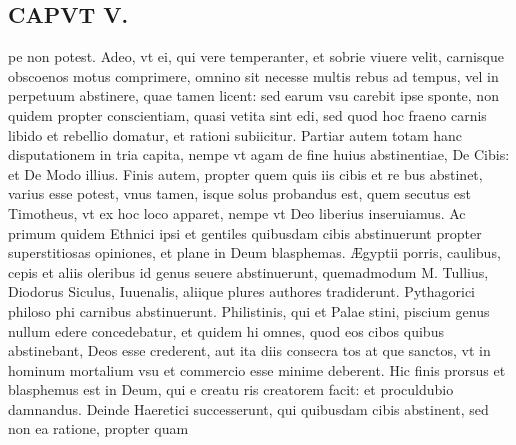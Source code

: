 \documentclass{article}
\begin{document}
\begin{pages}
\section*{CAPVT  V. }
\marginpar{[ p.373 ]}\pstart pe non potest. Adeo, vt ei, qui vere temperanter, et sobrie viuere velit, carnisque obscoenos motus comprimere, omnino sit necesse multis rebus ad tempus, vel in perpetuum abstinere, quae tamen licent: sed earum vsu carebit ipse sponte, non quidem propter conscientiam, quasi vetita sint edi, sed quod hoc fraeno carnis libido et rebellio domatur, et rationi subiicitur. Partiar autem totam hanc disputationem in tria capita, nempe vt agam de fine huius abstinentiae, De Cibis: et De Modo illius. Finis autem, propter quem quis iis cibis et re bus abstinet, varius esse potest, vnus tamen, isque solus probandus est, quem secutus est Timotheus, vt ex hoc loco apparet, nempe vt Deo liberius inseruiamus. Ac primum quidem Ethnici ipsi et gentiles quibusdam cibis abstinuerunt propter superstitiosas opiniones, et plane in Deum blasphemas. Ægyptii porris, caulibus, cepis et aliis oleribus id genus seuere abstinuerunt, quemadmodum M. Tullius, Diodorus Siculus, Iuuenalis, aliique plures authores tradiderunt. Pythagorici philoso phi carnibus abstinuerunt. Philistinis, qui et Palae stini, piscium genus nullum edere concedebatur, et quidem hi omnes, quod eos cibos quibus abstinebant, Deos esse crederent, aut ita diis consecra tos at que sanctos, vt in hominum mortalium vsu et commercio esse minime deberent. Hic finis prorsus et blasphemus est in Deum, qui e creatu ris creatorem facit: et proculdubio damnandus. Deinde Haeretici successerunt, qui quibusdam cibis abstinent, sed non ea ratione, propter quam  \pend

\end{pages}
\end{document}
